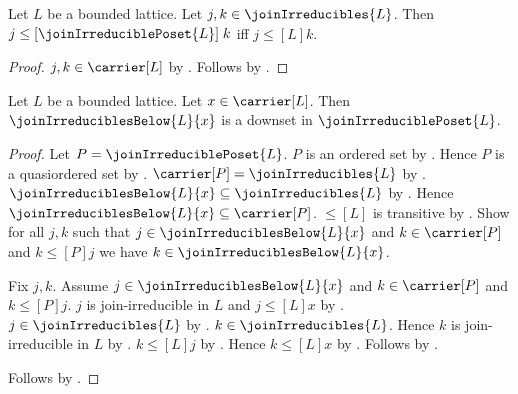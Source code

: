 \begin{proposition}\label{join_irreducible_poset_order_iff}
    Let $L$ be a bounded lattice.
    Let $j,k\in\joinIrreducibles{L}$.
    Then $j\mathrel{\leq[\joinIrreduciblePoset{L}]}k$ iff
        $j\mathrel{\leq[L]}k$.
\end{proposition}
\begin{proof}
    $j,k\in\carrier[L]$ by
        .
    Follows by
        .
\end{proof}

\begin{proposition}\label{join_irreducibles_below_is_downset}
    Let $L$ be a bounded lattice.
    Let $x\in\carrier[L]$.
    Then $\joinIrreduciblesBelow{L}{x}$ is a downset in
        $\joinIrreduciblePoset{L}$.
\end{proposition}
\begin{proof}
    Let $P=\joinIrreduciblePoset{L}$.
    $P$ is an ordered set by
        .
    Hence $P$ is a quasiordered set by .
    $\carrier[P]=\joinIrreducibles{L}$ by
        .
    $\joinIrreduciblesBelow{L}{x}\subseteq\joinIrreducibles{L}$ by
        .
    Hence $\joinIrreduciblesBelow{L}{x}\subseteq\carrier[P]$.
    $\leq[L]$ is transitive by
        .
    Show for all $j,k$ such that
        $j\in\joinIrreduciblesBelow{L}{x}$ and
        $k\in\carrier[P]$ and
        $k\mathrel{\leq[P]}j$ we have
        $k\in\joinIrreduciblesBelow{L}{x}$.
    \begin{subproof}
        Fix $j,k$.
        Assume $j\in\joinIrreduciblesBelow{L}{x}$ and
            $k\in\carrier[P]$ and $k\mathrel{\leq[P]}j$.
        $j$ is join-irreducible in $L$ and
            $j\mathrel{\leq[L]}x$ by
            .
        $j\in\joinIrreducibles{L}$ by
            .
        $k\in\joinIrreducibles{L}$.
        Hence $k$ is join-irreducible in $L$ by
            .
        $k\mathrel{\leq[L]}j$ by
            .
        Hence $k\mathrel{\leq[L]}x$ by .
        Follows by .
    \end{subproof}
    Follows by .
\end{proof}

